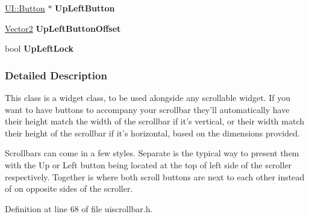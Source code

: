 \begin{DoxyCompactItemize}
\item 
\hypertarget{classMezzanine_1_1UI_1_1Scrollbar_af811909eb55be0ec5d203a057918e67e}{
\hyperlink{classMezzanine_1_1UI_1_1Button}{UI::Button} $\ast$ {\bfseries UpLeftButton}}
\label{classMezzanine_1_1UI_1_1Scrollbar_af811909eb55be0ec5d203a057918e67e}

\item 
\hypertarget{classMezzanine_1_1UI_1_1Scrollbar_a8ad09826d467e6995c123c9ffbffaadc}{
\hyperlink{classMezzanine_1_1Vector2}{Vector2} {\bfseries UpLeftButtonOffset}}
\label{classMezzanine_1_1UI_1_1Scrollbar_a8ad09826d467e6995c123c9ffbffaadc}

\item 
\hypertarget{classMezzanine_1_1UI_1_1Scrollbar_a6ecd3e66ba8c4d2101820b4e0a3ba3c4}{
bool {\bfseries UpLeftLock}}
\label{classMezzanine_1_1UI_1_1Scrollbar_a6ecd3e66ba8c4d2101820b4e0a3ba3c4}

\end{DoxyCompactItemize}


\subsubsection{Detailed Description}
This class is a widget class, to be used alongside any scrollable widget. If you want to have buttons to accompany your scrollbar they'll automatically have their height match the width of the scrollbar if it's vertical, or their width match their height of the scrollbar if it's horizontal, based on the dimensions provided. \par
 Scrollbars can come in a few styles. Separate is the typical way to present them with the Up or Left button being located at the top of left side of the scroller respectively. Together is where both scroll buttons are next to each other instead of on opposite sides of the scroller. 

Definition at line 68 of file uiscrollbar.h.



